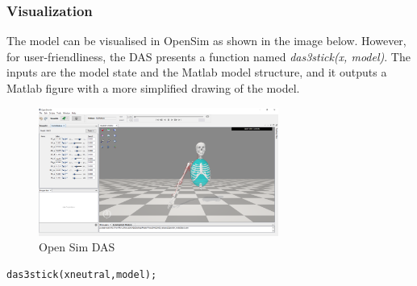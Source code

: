 \subsubsection{Visualization}

The model can be visualised in OpenSim as shown in the image below. However, for user-friendliness, the \ac{DAS} presents a function named \textit{das3stick(x, model)}. The inputs are the model state and the Matlab model structure, and it outputs a Matlab figure with a more simplified drawing of the model. 
\begin{figure}[h]
    \centering
    \includegraphics[width=0.7\textwidth]{Pictures/DAS/OpenSimModel.png}
    \caption{Open Sim \ac{DAS}}
    \label{fig:OpenSimDAS}
\end{figure}

\begin{lstlisting}[style=Matlab-editor]
das3stick(xneutral,model);
 \end{lstlisting}

\newpage

